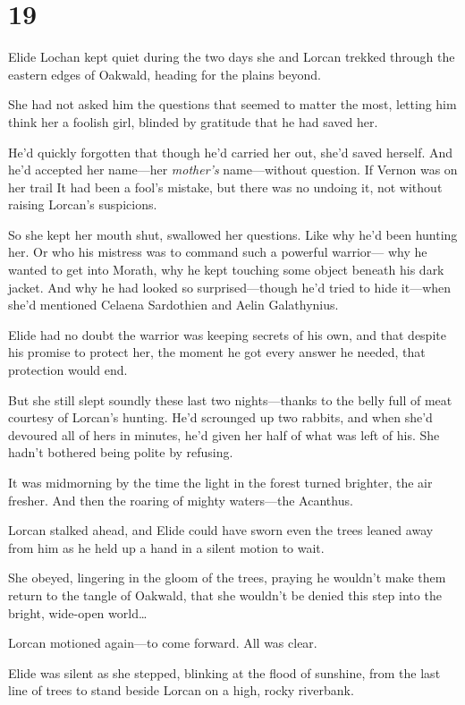 
\chapter{19}

Elide Lochan kept quiet during the two days she and Lorcan trekked through the eastern edges of Oakwald, heading for the plains beyond.

She had not asked him the questions that seemed to matter the most, letting him think her a foolish girl, blinded by gratitude that he had saved her.

He'd quickly forgotten that though he'd carried her out, she'd saved herself. And he'd accepted her name---her \emph{mother's} name---without question. If Vernon was on her trail  It had been a fool's mistake, but there was no undoing it, not without raising Lorcan's suspicions.

So she kept her mouth shut, swallowed her questions. Like why he'd been hunting her. Or who his mistress was to command such a powerful warrior--- why he wanted to get into Morath, why he kept touching some object beneath his dark jacket. And why he had looked so surprised---though he'd tried to hide it---when she'd mentioned Celaena Sardothien and Aelin Galathynius.

Elide had no doubt the warrior was keeping secrets of his own, and that despite his promise to protect her, the moment he got every answer he needed, that protection would end.

But she still slept soundly these last two nights---thanks to the belly full of meat courtesy of Lorcan's hunting. He'd scrounged up two rabbits, and when she'd devoured all of hers in minutes, he'd given her half of what was left of his. She hadn't bothered being polite by refusing.

It was midmorning by the time the light in the forest turned brighter, the air fresher. And then the roaring of mighty waters---the Acanthus.

Lorcan stalked ahead, and Elide could have sworn even the trees leaned away from him as he held up a hand in a silent motion to wait.

She obeyed, lingering in the gloom of the trees, praying he wouldn't make them return to the tangle of Oakwald, that she wouldn't be denied this step into the bright, wide-open world\ldots{}

Lorcan motioned again---to come forward. All was clear.

Elide was silent as she stepped, blinking at the flood of sunshine, from the last line of trees to stand beside Lorcan on a high, rocky riverbank.

